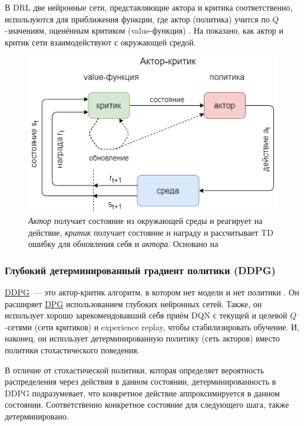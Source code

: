 В DRL две нейронные сети, представляющие актора и критика соответственно, используются для приближения функции, где актор (политика) учится по $Q$-значениям, оценённым критиком (value-функция) \cite{Arulkumaran_2017}. На  показано, как актор и критик сети взаимодействуют с окружающей средой.

\begin{figure}[ht!]
    \center
    \includegraphics [scale=0.60] {my_folder/images/ch1/RL-actor-critic.png}
    \caption{{\itshape Актор} получает состояние из окружающей среды и реагирует на действие, {\itshape критик} получает состояние и награду и рассчитывает TD ошибку для обновления себя и {\itshape актора}. Основано на \cite{Arulkumaran_2017}}
    \label{fig:ch1-RL-actor-critic}
\end{figure}

\subsubsection{Глубокий детерминированный градиент политики (DDPG)}

\hyperref[acr:ddpg]{DDPG}~--- это актор-критик алгоритм, в котором нет модели и нет политики \cite{lillicrap2015continuous}. Он расширяет \hyperref[acr:dpg]{DPG} использованием глубоких нейронных сетей. Также, он использует хорошо зарекомендовавший себя приём DQN с текущей и целевой $Q$-сетями (сети критиков) и experience replay, чтобы стабилизировать обучение. И, наконец, он использует детерминированную политику (сеть акторов) вместо политики стохастического поведения.

В отличие от стохастической политики, которая определяет вероятность распределения через действия в данном состоянии, детерминированность в DDPG подразумевает, что конкретное действие аппроксимируется в данном состоянии. Соответственно конкретное состояние для следующего шага, также детерминировано.

